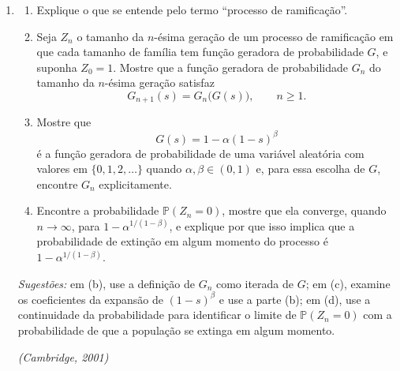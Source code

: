 \documentclass[12pt,portuguese]{article}
\theoremstyle{definition}
\theoremstyle{plainexercise}
\theoremstyle{starredexercise}
\theoremstyle{definition}
\begin{document}
\begin{enumerate}[label={\arabic*.}]
\emph{Sugestão:} o fator $s$ conta o indivíduo da geração $0$ em $T_n$.
A composição reúne os totais das $Y_1$ linhagens que partem da primeira
geração, cada uma delas com $n-1$ gerações contadas a partir de seu próprio
fundador.

\smallskip
\noindent\emph{(Oxford, 1974)}

\item
\begin{enumerate}[label=(\alph*)]
  \item Explique o que se entende pelo termo ``processo de ramificação''.
  \item Seja $Z_n$ o tamanho da $n$-ésima geração de um processo de ramificação
        em que cada tamanho de família tem função geradora de probabilidade
        $G$, e suponha $Z_0=1$. Mostre que a função geradora de probabilidade
        $G_n$ do tamanho da $n$-ésima geração satisfaz
        \[
        G_{n+1}(s)=G_n\bigl(G(s)\bigr),
        \qquad n\geqslant 1.
        \]
  \item Mostre que
        \[
        G(s)=1-\alpha(1-s)^{\beta}
        \]
        é a função geradora de probabilidade de uma variável aleatória com
        valores em $\{0,1,2,\ldots\}$
        quando $\alpha,\beta\in(0,1)$ e, para essa escolha de $G$, encontre
        $G_n$ explicitamente.
  \item Encontre a probabilidade $\mathbb{P}(Z_n=0)$, mostre que ela converge,
        quando $n\to\infty$, para $1-\alpha^{1/(1-\beta)}$, e explique por que
        isso implica que a probabilidade de extinção em algum momento do processo é
        $1-\alpha^{1/(1-\beta)}$.
\end{enumerate}

\emph{Sugestões:} em (b), use a definição de $G_n$ como iterada de $G$; em
(c), examine os coeficientes da expansão de $(1-s)^{\beta}$ e use a parte (b);
em (d), use a continuidade da probabilidade para identificar o limite de
$\mathbb{P}(Z_n=0)$ com a probabilidade de que a população se extinga em
algum momento.

\smallskip
\noindent\emph{(Cambridge, 2001)}
\end{enumerate}



\end{document}
